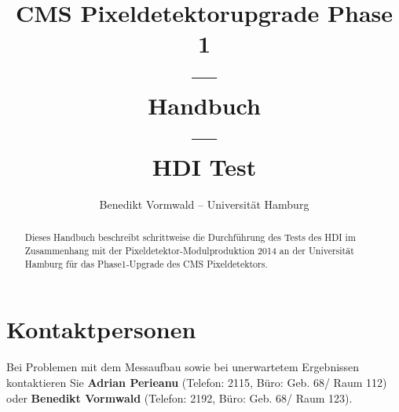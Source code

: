 \documentclass[a4paper,12pt,pointlessnumbers]{scrartcl}
\title{CMS Pixeldetektorupgrade Phase 1\\---\\Handbuch\\---\\HDI Test}
\author{Benedikt Vormwald -- Universit\"{a}t Hamburg}
\begin{document}
\maketitle
\begin{abstract}
Dieses Handbuch beschreibt schrittweise die Durchf\"{u}hrung des Tests des HDI im Zusammenhang mit der Pixeldetektor-Modulproduktion 2014 an der Universit\"{a}t Hamburg f\"{u}r das Phase1-Upgrade des CMS Pixeldetektors.
\end{abstract}

\tableofcontents
\newpage

\section{Kontaktpersonen}
Bei Problemen mit dem Messaufbau sowie bei unerwartetem Ergebnissen kontaktieren Sie
\textbf{Adrian Perieanu} (Telefon: 2115, B{\"u}ro: Geb. 68/ Raum 112) oder \textbf{Benedikt Vormwald} (Telefon: 2192, B{\"u}ro: Geb. 68/ Raum 123).
\end{document}
